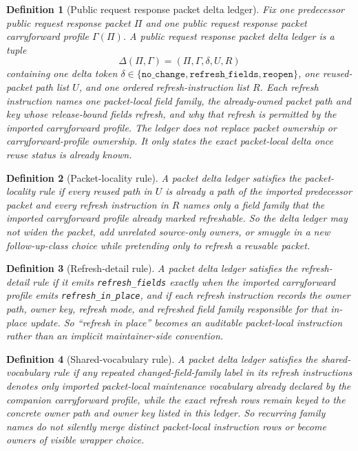 \documentclass[11pt]{article}
\newtheorem{definition}{Definition}
\begin{document}
\begin{definition}[Public request response packet delta ledger]
Fix one predecessor public request response packet $\Pi$ and one public request response packet carryforward profile $\Gamma(\Pi)$.
A \emph{public request response packet delta ledger} is a tuple
\[
\Delta(\Pi,\Gamma)=(\Pi,\Gamma,\delta,U,R)
\]
containing one delta token $\delta\in\{\texttt{no\_change},\texttt{refresh\_fields},\texttt{reopen}\}$, one reused-packet path list $U$, and one ordered refresh-instruction list $R$.
Each refresh instruction names one packet-local field family, the already-owned packet path and key whose release-bound fields refresh, and why that refresh is permitted by the imported carryforward profile.
The ledger does not replace packet ownership or carryforward-profile ownership.
It only states the exact packet-local delta once reuse status is already known.
\end{definition}

\begin{definition}[Packet-locality rule]
A packet delta ledger satisfies the \emph{packet-locality rule} if every reused path in $U$ is already a path of the imported predecessor packet and every refresh instruction in $R$ names only a field family that the imported carryforward profile already marked refreshable.
So the delta ledger may not widen the packet, add unrelated source-only owners, or smuggle in a new follow-up-class choice while pretending only to refresh a reusable packet.
\end{definition}

\begin{definition}[Refresh-detail rule]
A packet delta ledger satisfies the \emph{refresh-detail rule} if it emits \texttt{refresh\_fields} exactly when the imported carryforward profile emits \texttt{refresh\_in\_place}, and if each refresh instruction records the owner path, owner key, refresh mode, and refreshed field family responsible for that in-place update.
So ``refresh in place'' becomes an auditable packet-local instruction rather than an implicit maintainer-side convention.
\end{definition}

\begin{definition}[Shared-vocabulary rule]
A packet delta ledger satisfies the \emph{shared-vocabulary rule} if any repeated changed-field-family label in its refresh instructions denotes only imported packet-local maintenance vocabulary already declared by the companion carryforward profile, while the exact refresh rows remain keyed to the concrete owner path and owner key listed in this ledger.
So recurring family names do not silently merge distinct packet-local instruction rows or become owners of visible wrapper choice.
\end{definition}
\end{document}
